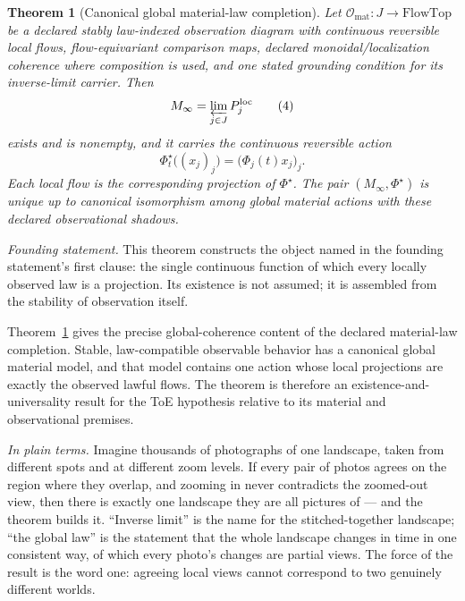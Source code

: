 \documentclass[11pt]{article}
\newtheorem{theorem}{Theorem}
\theoremstyle{definition}
\newcommand{\Omat}{\mathcal{O}_{\mathrm{mat}}}
\newcommand{\Minf}{M_\infty}
\newcommand{\plainterms}{\emph{In plain terms.}}
\newcommand{\founding}{\emph{Founding statement.}}
\begin{document}
\begin{theorem}[Canonical global material-law completion]
\label{thm:global-material-law}
Let $\Omat : J \to \mathrm{FlowTop}$ be a declared stably law-indexed observation diagram with continuous reversible local flows, flow-equivariant comparison maps, declared monoidal/localization coherence where composition is used, and one stated grounding condition for its inverse-limit carrier. Then
\begin{equation}
\Minf = \varprojlim_{j \in J} P^{\mathrm{loc}}_j \tag{4}
\end{equation}
exists and is nonempty, and it carries the continuous reversible action
\begin{equation}
\Phi^{\star}_t\big((x_j)_j\big) = \big(\Phi_j(t)x_j\big)_j. \tag{5}
\end{equation}
Each local flow is the corresponding projection of $\Phi^{\star}$. The pair $(\Minf, \Phi^{\star})$ is unique up to canonical isomorphism among global material actions with these declared observational shadows.
\end{theorem}

\noindent\founding{} This theorem constructs the object named in the founding statement's first clause: the single continuous function of which every locally observed law is a projection. Its existence is not assumed; it is assembled from the stability of observation itself.

Theorem~\ref{thm:global-material-law} gives the precise global-coherence content of the declared material-law completion. Stable, law-compatible observable behavior has a canonical global material model, and that model contains one action whose local projections are exactly the observed lawful flows. The theorem is therefore an existence-and-universality result for the ToE hypothesis relative to its material and observational premises.

\noindent\plainterms{} Imagine thousands of photographs of one landscape, taken from different spots and at different zoom levels. If every pair of photos agrees on the region where they overlap, and zooming in never contradicts the zoomed-out view, then there is exactly one landscape they are all pictures of --- and the theorem builds it. ``Inverse limit'' is the name for the stitched-together landscape; ``the global law'' is the statement that the whole landscape changes in time in one consistent way, of which every photo's changes are partial views. The force of the result is the word one: agreeing local views cannot correspond to two genuinely different worlds.
\end{document}
